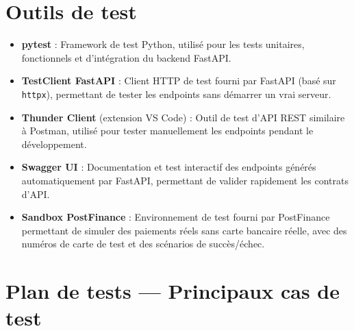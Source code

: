 \documentclass[12pt, a4paper]{report}
\renewcommand{\_}{\origunderscore\allowbreak}
\begin{document}
\section{Outils de test}

\begin{itemize}
    \item \textbf{pytest} : Framework de test Python, utilisé pour les tests unitaires, fonctionnels et d'intégration du backend FastAPI.
    \item \textbf{TestClient FastAPI} : Client HTTP de test fourni par FastAPI (basé sur \texttt{httpx}), permettant de tester les endpoints sans démarrer un vrai serveur.
    \item \textbf{Thunder Client} (extension VS Code) : Outil de test d'API REST similaire à Postman, utilisé pour tester manuellement les endpoints pendant le développement.
    \item \textbf{Swagger UI} : Documentation et test interactif des endpoints générés automatiquement par FastAPI, permettant de valider rapidement les contrats d'API.
    \item \textbf{Sandbox PostFinance} : Environnement de test fourni par PostFinance permettant de simuler des paiements réels sans carte bancaire réelle, avec des numéros de carte de test et des scénarios de succès/échec.
\end{itemize}

\section{Plan de tests — Principaux cas de test}
\end{document}
